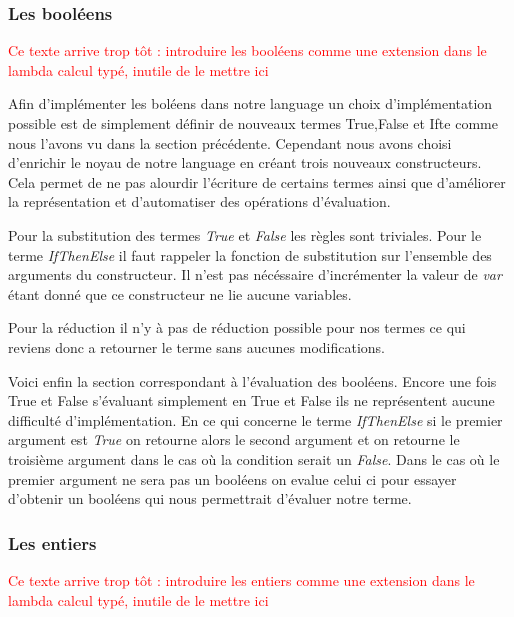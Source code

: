\documentclass {article}
\newcommand{\codefrom}[3]
           {}
\theoremstyle{definition}
\theoremstyle{remark}
\newcommand{\todo}[1]{\textcolor{red}{#1}}
\begin{document}
\subsubsection{Les booléens}

\todo{Ce texte arrive trop tôt : introduire les booléens comme une extension dans le lambda calcul typé, inutile de le mettre ici}

Afin d'implémenter les boléens dans notre language un choix d'implémentation 
possible est de simplement définir de nouveaux termes True,False et Ifte
comme nous l'avons vu dans la section précédente. Cependant nous avons choisi 
d'enrichir le noyau de notre language en créant trois nouveaux constructeurs.
Cela permet de ne pas alourdir l'écriture de certains termes ainsi que 
d'améliorer la représentation et d'automatiser des opérations d'évaluation.

\codefrom{untyped}{lambda}{bool_term}

Pour la substitution des termes \emph{True} et \emph{False} les règles 
sont triviales. Pour le terme \emph{IfThenElse} il faut rappeler la 
fonction de substitution sur l'ensemble des arguments du constructeur.
Il n'est pas nécéssaire d'incrémenter la valeur de \emph{var} étant donné
que ce constructeur ne lie aucune variables.

\codefrom{untyped}{lambda}{bool_substitution}

Pour la réduction il n'y à pas de réduction possible pour nos termes
ce qui reviens donc a retourner le terme sans aucunes modifications.


Voici enfin la section correspondant à l'évaluation des booléens.
Encore une fois True et False s'évaluant simplement en True et False ils
ne représentent aucune difficulté d'implémentation. En ce qui concerne
le terme \emph{IfThenElse} si le premier argument est \emph{True}
on retourne alors le second argument et on retourne le troisième argument 
dans le cas où la condition serait un \emph{False}. Dans le cas 
où le premier argument ne sera pas un booléens on evalue celui ci pour 
essayer d'obtenir un booléens qui nous permettrait d'évaluer notre 
terme.

\codefrom{untyped}{lambda}{bool_evaluation}


\subsubsection{Les entiers}

\todo{Ce texte arrive trop tôt : introduire les entiers comme une extension dans le lambda calcul typé, inutile de le mettre ici}
\end{document}
